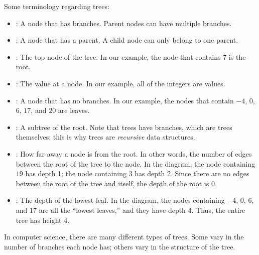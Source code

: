 Some terminology regarding trees:
\begin{itemize}
\item {}: A node that has branches. Parent nodes can have
  multiple branches.
\item {}: A node that has a parent. A child node can only
  belong to one parent.
\item {}: The top node of the tree. In our example, the node that
  contains $7$ is the root.
\item {}: The value at a node. In our example, all of the integers
  are values.
\item {}: A node that has no branches. In our example, the nodes that
  contain $-4$, $0$, $6$, $17$, and $20$ are leaves.
\item {}: A subtree of the root. Note that trees have branches, which are trees themselves: this is why trees are \emph{recursive} data structures.
\item {}: How far away a node is from the root. In other
  words, the number of edges between the root of the tree to the
  node. In the diagram, the node containing $19$ has depth 1; the node
  containing $3$ has depth 2. Since there are no edges between the
  root of the tree and itself, the depth of the root is 0.
\item {}: The depth of the lowest leaf. In the diagram, the nodes
  containing $-4$, $0$, $6$, and $17$ are all the ``lowest leaves,'' and they
  have depth 4. Thus, the entire tree has height 4.
\end{itemize}

In computer science, there are many different types of trees. Some vary in
the number of branches each node has; others vary in the structure of the
tree.
